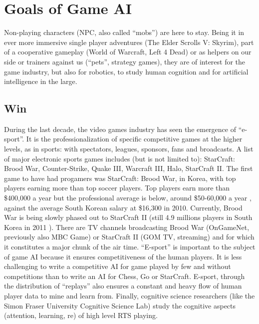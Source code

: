
\section{Goals of Game AI}
Non-playing characters (NPC, also called ``mobs'') are here to stay. Being it in ever more immersive single player adventures (The Elder Scrolls V: Skyrim), part of a cooperative gameplay (World of Warcraft, Left 4 Dead) or as helpers on our side or trainers against us (``pets'', strategy games), they are of interest for the game industry, but also for robotics, to study human cognition and for artificial intelligence in the large.

\subsection{Win}
During the last decade, the video games industry has seen the emergence of ``e-sport''. It is the professionalization of specific competitive games at the higher levels, as in sports: with spectators, leagues, sponsors, fans and broadcasts. A %
list of major electronic sports games includes (but is not limited to): StarCraft: Brood War, Counter-Strike, Quake III, Warcraft III, Halo, StarCraft II. The first game to have had progamers was StarCraft: Brood War, in Korea, with top players earning more than top soccer players. Top players earn more than \$400,000 a year but the professional average is below, around \$50-60,000 a year \citep{TeamLiquidPGMIncome}, against the average South Korean salary at \$16,300 in 2010. Currently, Brood War is being slowly phased out to StarCraft II (still 4.9 millions players in South Korea in 2011 \citep{CitationNeeded}). There are TV channels broadcasting Brood War (OnGameNet, previously also MBC Game) or StarCraft II (GOM TV, streaming) and for which it constitutes a major chunk of the air time. %
``E-sport'' is important to the subject of game AI because it ensures competitiveness of the human players. It is less challenging to write a competitive AI for game played by few and without competitions than to write an AI for Chess, Go or StarCraft. E-sport, through the distribution of ``replays'' also ensures a constant and heavy flow of human player data to mine and learn from. Finally, cognitive science researchers (like the Simon Fraser University Cognitive Science Lab) study the cognitive aspects (attention, learning, re) of high level RTS playing\citep{CitationNeeded}.

